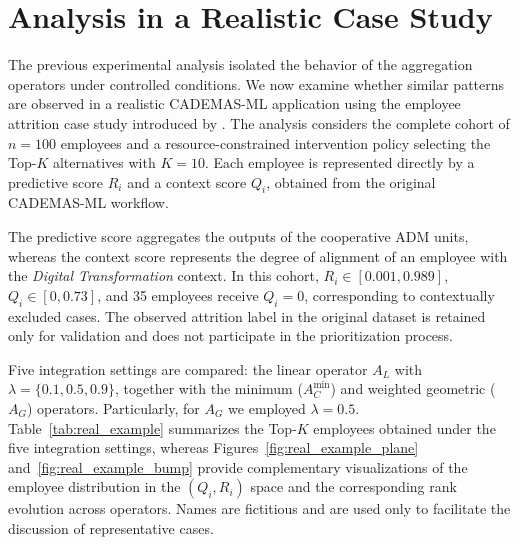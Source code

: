 \documentclass[mathematics,article,submit,moreauthors]{Definitions/mdpi}
\begin{document}
{\color{blue}
\section{Analysis in a Realistic Case Study}
\label{sect:real_example}

The previous experimental analysis isolated the behavior of the aggregation operators under controlled conditions. We now examine whether similar patterns are observed in a realistic CADEMAS-ML application using the employee attrition case study introduced by \citet{Godz2026}. The analysis considers the complete cohort of $n=100$ employees and a resource-constrained intervention policy selecting the Top-$K$ alternatives with $K=10$. Each employee is represented directly by a predictive score $R_i$ and a context score $Q_i$, obtained from the original CADEMAS-ML workflow.

The predictive score aggregates the outputs of the cooperative ADM units, whereas the context score represents the degree of alignment of an employee with the \textit{Digital Transformation} context. In this cohort, $R_i\in[0.001,0.989]$, $Q_i\in[0,0.73]$, and 35 employees receive $Q_i=0$, corresponding to contextually excluded cases. The observed attrition label in the original dataset is retained only for validation and does not participate in the prioritization process.

Five integration settings are compared: the linear operator $A_L$ with $\lambda=\{0.1,0.5,0.9\}$, together with the minimum ($A_C^{\min}$) and weighted geometric ($A_G$) operators. Particularly, for $A_G$ we employed $\lambda=0.5$. Table~\ref{tab:real_example} summarizes the Top-$K$ employees obtained under the five integration settings, whereas Figures~\ref{fig:real_example_plane} and~\ref{fig:real_example_bump} provide complementary visualizations of the employee distribution in the $(Q_i,R_i)$ space and the corresponding rank evolution across operators. Names are fictitious and are used only to facilitate the discussion of representative cases.

}
\end{document}
